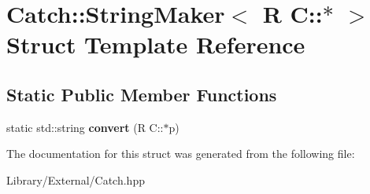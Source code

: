 \hypertarget{struct_catch_1_1_string_maker_3_01_r_01_c_1_1_5_01_4}{}\section{Catch\+:\+:String\+Maker$<$ R C\+:\+:$\ast$ $>$ Struct Template Reference}
\label{struct_catch_1_1_string_maker_3_01_r_01_c_1_1_5_01_4}
\subsection*{Static Public Member Functions}
\begin{DoxyCompactItemize}
\item 
\hypertarget{struct_catch_1_1_string_maker_3_01_r_01_c_1_1_5_01_4_af69c15e0b406e945777137fe4a333731}{}static std\+::string {\bfseries convert} (R C\+::$\ast$p)\label{struct_catch_1_1_string_maker_3_01_r_01_c_1_1_5_01_4_af69c15e0b406e945777137fe4a333731}

\end{DoxyCompactItemize}


The documentation for this struct was generated from the following file\+:\begin{DoxyCompactItemize}
\item 
Library/\+External/Catch.\+hpp\end{DoxyCompactItemize}
